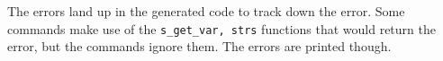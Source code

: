 The errors land up in the generated code to track down the error. Some
commands make use of the \texttt{s\_get\_var,\ strs} functions that
would return the error, but the commands ignore them. The errors are
printed though.
